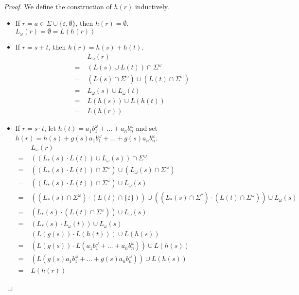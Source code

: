 \begin{proof}
	We define the construction of $h(r)$ inductively.
	\begin{itemize}
		\item If $r = a \in \Sigma \cup \{\varepsilon, \emptyset\}$, then $h(r) = \emptyset$.\\
			$L_\omega(r) = \emptyset = L(h(r))$
		
		\item If $r = s + t$, then $h(r) = h(s) + h(t)$.\\
		\begin{align*}
			& L_\omega(r) \\
			=\;& (L(s) \cup L(t)) \cap \Sigma^\omega \\
			=\;& (L(s) \cap \Sigma^\omega) \cup (L(t) \cap \Sigma^\omega) \\
			=\;& L_\omega(s) \cup L_\omega(t) \\
			=\;& L(h(s)) \cup L(h(t)) \\
			=\;& L(h(r))
		\end{align*}
		
		\item If $r = s \cdot t$, let $h(t) = a_1 b_1^\omega + \dots + a_n b_n^\omega$ and set $h(r) = h(s) + g(s) a_1 b_1^\omega + \dots + g(s) a_n b_n^\omega$. \\
		\begin{align*}
			& L_\omega(r) \\
			=\;& ((L_*(s) \cdot L(t)) \cup L_\omega(s)) \cap \Sigma^\omega \\
			=\;& ((L_*(s) \cdot L(t)) \cap \Sigma^\omega) \cup (L_\omega(s) \cap \Sigma^\omega) \\
			=\;& ((L_*(s) \cdot L(t)) \cap \Sigma^\omega) \cup L_\omega(s) \\
			=\;& ((L_*(s) \cap \Sigma^\omega) \cdot (L(t) \cap \{\varepsilon\})) \cup ((L_*(s) \cap \Sigma^*) \cdot (L(t) \cap \Sigma^\omega)) \cup L_\omega(s) \\
			=\;& (L_*(s) \cdot (L(t) \cap \Sigma^\omega)) \cup L_\omega(s) \\
			=\;& (L_*(s) \cdot L_\omega(t)) \cup L_\omega(s) \\
			=\;& (L(g(s)) \cdot L(h(t))) \cup L(h(s)) \\
			=\;& (L(g(s)) \cdot L(a_1 b_1^\omega + \dots + a_n b_n^\omega)) \cup L(h(s)) \\
			=\;& (L(g(s) a_1 b_1^\omega + \dots + g(s) a_n b_n^\omega)) \cup L(h(s)) \\
			=\;& L(h(r))
		\end{align*}
		

\end{itemize}
\end{proof}

